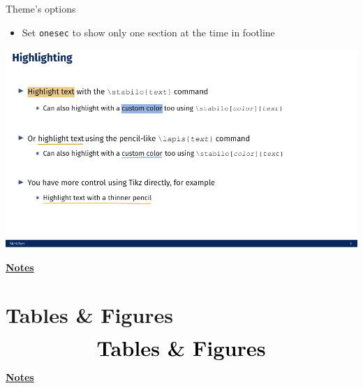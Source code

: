 \documentclass[10pt]{beamer}
\begin{document}
\begin{frame}
    {Theme's options}
    \begin{itemize}
        \item Set \texttt{onesec} to show only one section at the time in footline
    \end{itemize}
    \begin{center}
        \begin{minipage}[b]{.6\textwidth}
            \includegraphics[width=\textwidth]{onesec}
        \end{minipage}
    \end{center}
\end{frame}
\begin{flushleft}
    \underline{\textbf{Notes}}\setlength{\parskip}{.15cm}\notesize\newline\par
\end{flushleft}

\section{Tables \& Figures}
\begin{frame}
	\begin{eqnarray*}
		&\text{{\huge \textbf{Tables \& Figures}}}\\
	\end{eqnarray*}
\end{frame}
\begin{flushleft}
	\underline{\textbf{Notes}}\setlength{\parskip}{.15cm}\notesize\newline\par
\end{flushleft}
\end{document}
